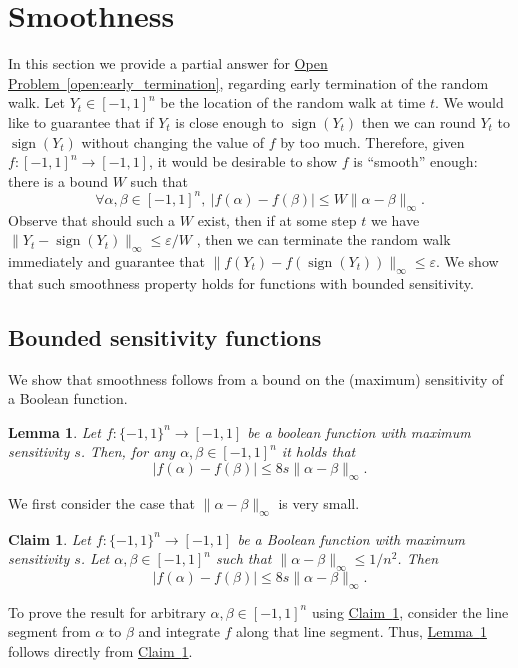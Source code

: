 \documentclass[11pt]{article}
\numberwithin{equation}{section}
\newtheorem{lemma}[theorem]{Lemma}
\newtheorem{claim}[theorem]{Claim}
\theoremstyle{definition}
\theoremstyle{plain}
\newcommand{\expref}[2]{\hyperref[#2]{#1~\ref{#2}}}
\newcommand{\eps}{\varepsilon}
\DeclareMathOperator{\sign}{sign}     %
\begin{document}
\section{Smoothness}
\label{section:smoothness}
In this section we provide a partial answer for
\expref{Open Problem}{open:early_termination}, regarding early termination of the random walk. Let $Y_t \in [-1,1]^n$ be the location of the random walk at time $t$. We would like to guarantee that if  $Y_t$ is close enough to $\sign(Y_t)$ then we can round $Y_t$ to $\sign(Y_t)$ without changing the value of $f$ by too much. Therefore, given $f:[-1,1]^n\to [-1,1]$, it would be desirable to show $f$ is ``smooth'' enough: there is a bound $W$ such that
$$
\forall \alpha,\beta \in [-1,1]^n, \ |f(\alpha)-f(\beta)| \le W \|\alpha-\beta\|_\infty.
$$
Observe that should such a $W$ exist, then if at some step $t$ we have $\|Y_t-\sign(Y_t)\|_\infty\leq \eps/W$ ,  then we can terminate the random walk immediately and guarantee that $\|f(Y_t)-f(\sign(Y_t))\|_\infty\leq \eps$.
We show that such smoothness property holds for functions with bounded sensitivity.


\subsection{Bounded sensitivity functions}

We show that smoothness follows from a bound on the (maximum) sensitivity of a Boolean function.

\begin{lemma}
\label{lemma:sensitivity_smoothness}
Let $f:\{-1,1\}^n\to [-1,1]$ be a boolean function with maximum sensitivity $s$. Then, for any $\alpha,\beta\in [-1,1]^n$ it holds that
$$
|f(\alpha) - f(\beta) | \leq 8s \|\alpha -\beta\|_\infty.
$$
\end{lemma}

We first consider the case that $\|\alpha-\beta\|_\infty$ is very small.
\begin{claim}
\label{claim:small_distance}
Let $f:\{-1,1\}^n\to [-1,1]$ be a Boolean function with maximum sensitivity $s$. 
Let $\alpha,\beta\in [-1,1]^n$ such that $\|\alpha-\beta\|_\infty \leq 1/n^2$. Then
$$
|f(\alpha) - f(\beta) | \leq 8s \|\alpha -\beta\|_\infty.
$$
\end{claim}


To prove the result for arbitrary $\alpha,\beta\in [-1,1]^n$ using \expref{Claim}{claim:small_distance}, consider the line segment from $\alpha$ to $\beta$ and integrate $f$ along that line segment. Thus, \expref{Lemma}{lemma:sensitivity_smoothness} follows directly from \expref{Claim}{claim:small_distance}.
\end{document}
